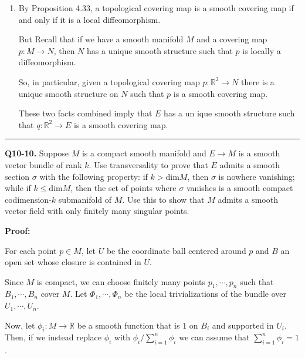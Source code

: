 \documentclass{article}
\newcommand{\R}{\mathbb{R}}
\begin{document}
\begin{enumerate}[label=(\alph*)]
  \item By Proposition 4.33, a topological covering map is a smooth covering map if and only if it is a local diffeomorphism.
  
  \vskip 0.5cm 
  But Recall that if we have a smooth manifold $M$ and a covering map $p : M \rightarrow N$, then $N$ has a unique smooth structure such that $p$ is locally a diffeomorphism.
  
  \vskip 0.5cm 
  So, in particular, given a topological covering map $p : \R^2 \rightarrow N$ there is a unique smooth structure on $N$ such that $p$ is a smooth covering map. 

  \vskip 0.5cm 
  These two facts combined imply that $E$ has a un ique smooth structure such that $q : \R^2 \rightarrow E$ is a smooth covering map.



\end{enumerate}


\vskip 0.5cm
\hrule 
\vskip 0.5cm


\textbf{Q10-10.} Suppose $M$ is a compact smooth manifold and $E \rightarrow M$ is a smooth vector bundle of rank $k$. Use transversality to prove that $E$ admits a smooth section $\sigma$ with the following property: if $k > \mathrm{dim } M$, then $\sigma$ is nowhere vanishing; while if $k \leq \mathrm{dim } M$, then the set of points where $\sigma$ vanishes is a smooth compact codimension-$k$ submanifold of $M$. Use this to show that $M$ admits a smooth vector field with only finitely many singular points.  

\vskip 0.5cm
\textbf{Proof:}

For each point $p \in M$, let $U$ be the coordinate ball centered around $p$ and $B$ an open set whose closure is contained in $U$. 


Since $M$ is compact, we can choose finitely many points $p_1, \cdots, p_n$ such that $B_1, \cdots, B_n$ cover $M$. Let $\Phi_1, \cdots, \Phi_n$ be the local trivializations of the bundle over $U_1, \cdots, U_n$.

Now, let $\phi_i : M \rightarrow \R$ be a smooth function that is $1$ on $B_i$ and supported in $U_i$. Then, if we instead replace $\phi_i$ with $\phi_i / \sum_{i = 1}^{n} \phi_i$ we can assume that $\sum_{i = 1}^{n} \phi_i = 1$.
\end{document}
